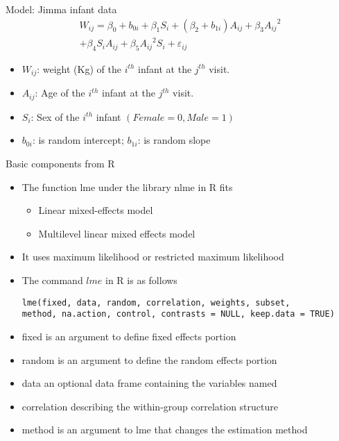 \documentclass{beamer}
\begin{document}
\begin{frame}{Model: Jimma infant data}
\begin{eqnarray*}
	W_{ij}=\beta_0 + b_{0i}+ \beta_1S_i + (\beta_2 +b_{1i})A_{ij} + \beta_3{A_{ij}}^2 \\
	+ \beta_4S_iA_{ij} +\beta_5{A_{ij}}^2S_i +\varepsilon_{ij}
\end{eqnarray*}
\begin{itemize}
	\item $W_{ij}$: weight (Kg)  of the $i^{th}$ infant at the $j^{th}$ visit.
	\item $A_{ij}$: Age of the $i^{th}$ infant at the $j^{th}$ visit.
	\item $S_i$: Sex of the $i^{th}$ infant $(Female=0, Male=1)$
	\item $b_{0i}$: is random intercept; $b_{1i}$: is random slope
\end{itemize}
\end{frame}

\begin{frame}[fragile]{Basic components from R}
\begin{itemize}
	\item The function lme under the library nlme in R fits 
	\begin{itemize}
		\item Linear mixed-effects model
		\item Multilevel linear mixed effects model  
	\end{itemize}
\item It uses maximum likelihood or restricted maximum likelihood
\item The command $lme$ in R is as follows
\begin{verbatim}
lme(fixed, data, random, correlation, weights, subset, 
method, na.action, control, contrasts = NULL, keep.data = TRUE)
\end{verbatim}
\item fixed is an argument to define fixed effects portion 
\item random is an argument to define the random effects portion 
\item  data an optional data frame containing the variables named 
\item correlation describing the within-group correlation structure
\item method is an argument to lme that changes the estimation method
\end{itemize}
\end{frame}
\end{document}
